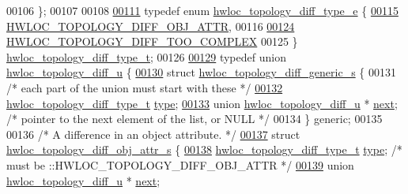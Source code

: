 \begin{DoxyCode}
00106 \};
00107 
00108 
\hyperlink{a00225_ga38b28b7423b85a3321e6d0062d5f83d0}{00111} \textcolor{keyword}{typedef} \textcolor{keyword}{enum} \hyperlink{a00225_ga38b28b7423b85a3321e6d0062d5f83d0}{hwloc\_topology\_diff\_type\_e} \{
\hyperlink{a00225_gga38b28b7423b85a3321e6d0062d5f83d0accbcaee230f79989debb284c8626f0c0}{00115}   \hyperlink{a00225_gga38b28b7423b85a3321e6d0062d5f83d0accbcaee230f79989debb284c8626f0c0}{HWLOC\_TOPOLOGY\_DIFF\_OBJ\_ATTR},
00116 
\hyperlink{a00225_gga38b28b7423b85a3321e6d0062d5f83d0a3dc01fdeff355efe3fb2516bb454a147}{00124}   \hyperlink{a00225_gga38b28b7423b85a3321e6d0062d5f83d0a3dc01fdeff355efe3fb2516bb454a147}{HWLOC\_TOPOLOGY\_DIFF\_TOO\_COMPLEX}
00125 \} \hyperlink{a00225_ga4b86adb00c8b2d09ebc4ef8f3bfd92b2}{hwloc\_topology\_diff\_type\_t};
00126 
\hyperlink{a00350}{00129} \textcolor{keyword}{typedef} \textcolor{keyword}{union }\hyperlink{a00350}{hwloc\_topology\_diff\_u} \{
\hyperlink{a00354}{00130}   \textcolor{keyword}{struct }\hyperlink{a00354}{hwloc\_topology\_diff\_generic\_s} \{
00131     \textcolor{comment}{/* each part of the union must start with these */}
\hyperlink{a00354_a373005489fcddeba6319163e60263ae8}{00132}     \hyperlink{a00225_ga4b86adb00c8b2d09ebc4ef8f3bfd92b2}{hwloc\_topology\_diff\_type\_t} \hyperlink{a00354_a373005489fcddeba6319163e60263ae8}{type};
\hyperlink{a00354_a720aa94eb73cddfd8d6bf9fcbbfc035e}{00133}     \textcolor{keyword}{union }\hyperlink{a00350}{hwloc\_topology\_diff\_u} * \hyperlink{a00354_a720aa94eb73cddfd8d6bf9fcbbfc035e}{next}; \textcolor{comment}{/* pointer to the next element of the
       list, or NULL */}
00134   \} \textcolor{keyword}{generic};
00135 
00136   \textcolor{comment}{/* A difference in an object attribute. */}
\hyperlink{a00358}{00137}   \textcolor{keyword}{struct }\hyperlink{a00358}{hwloc\_topology\_diff\_obj\_attr\_s} \{
\hyperlink{a00358_a70a118ad288bd98f18c8ce6dc52e2d10}{00138}     \hyperlink{a00225_ga4b86adb00c8b2d09ebc4ef8f3bfd92b2}{hwloc\_topology\_diff\_type\_t} \hyperlink{a00358_a70a118ad288bd98f18c8ce6dc52e2d10}{type}; \textcolor{comment}{/* must be
       ::HWLOC\_TOPOLOGY\_DIFF\_OBJ\_ATTR */}
\hyperlink{a00358_acb9170a8eb3392656d70f7f3ef3e3eed}{00139}     \textcolor{keyword}{union }\hyperlink{a00350}{hwloc\_topology\_diff\_u} * \hyperlink{a00358_acb9170a8eb3392656d70f7f3ef3e3eed}{next};

\end{DoxyCode}
